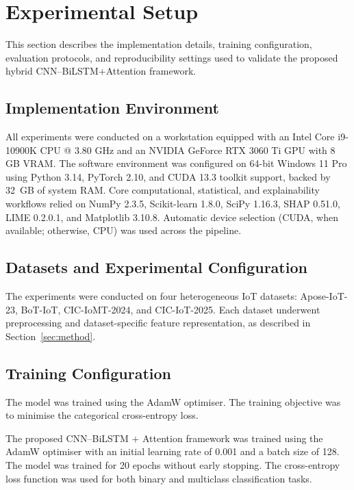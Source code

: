 \documentclass[a4paper,fleqn]{cas-sc}
\begin{document}
\section{Experimental Setup}
\label{sec:setup}

This section describes the implementation details, training configuration, evaluation protocols, and reproducibility settings used to validate the proposed hybrid CNN--BiLSTM+Attention framework.

\subsection{Implementation Environment}

All experiments were conducted on a workstation equipped with an Intel Core i9-10900K CPU @ 3.80 GHz and an NVIDIA GeForce RTX 3060 Ti GPU with 8 GB VRAM. The software environment was configured on 64-bit Windows 11 Pro using Python 3.14, PyTorch 2.10, and CUDA 13.3 toolkit support, backed by 32~GB of system RAM. Core computational, statistical, and explainability workflows relied on NumPy 2.3.5, Scikit-learn 1.8.0, SciPy 1.16.3, SHAP 0.51.0, LIME 0.2.0.1, and Matplotlib 3.10.8. Automatic device selection (CUDA, when available; otherwise, CPU) was used across the pipeline. 

\subsection{Datasets and Experimental Configuration}

The experiments were conducted on four heterogeneous IoT datasets: Apose-IoT-23, BoT-IoT, CIC-IoMT-2024, and CIC-IoT-2025. Each dataset underwent preprocessing and dataset-specific feature representation, as described in Section~\ref{sec:method}. 

\subsection{Training Configuration}

The model was trained using the AdamW optimiser. The training objective was to minimise the categorical cross-entropy loss.

The proposed CNN--BiLSTM + Attention framework was trained using the AdamW optimiser with an initial learning rate of 0.001 and a batch size of 128. The model was trained for 20 epochs without early stopping. The cross-entropy loss function was used for both binary and multiclass classification tasks.
\end{document}
